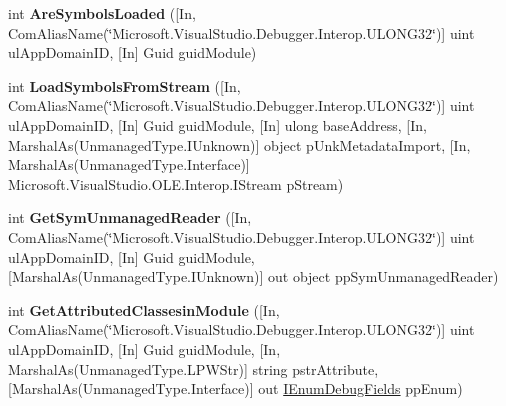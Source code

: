 \begin{DoxyCompactItemize}
\item 
\hypertarget{interface_microsoft_1_1_visual_studio_1_1_debugger_1_1_interop_e_e_1_1_i_debug_com_plus_symbol_provider2_a18fda72900c526d1e4e44181c9e6581f}{int {\bfseries Are\+Symbols\+Loaded} (\mbox{[}In, Com\+Alias\+Name(\char`\"{}Microsoft.\+Visual\+Studio.\+Debugger.\+Interop.\+U\+L\+O\+N\+G32\char`\"{})\mbox{]} uint ul\+App\+Domain\+I\+D, \mbox{[}In\mbox{]} Guid guid\+Module)}\label{interface_microsoft_1_1_visual_studio_1_1_debugger_1_1_interop_e_e_1_1_i_debug_com_plus_symbol_provider2_a18fda72900c526d1e4e44181c9e6581f}

\item 
\hypertarget{interface_microsoft_1_1_visual_studio_1_1_debugger_1_1_interop_e_e_1_1_i_debug_com_plus_symbol_provider2_a02071ed438612fba6e01a5adb0077161}{int {\bfseries Load\+Symbols\+From\+Stream} (\mbox{[}In, Com\+Alias\+Name(\char`\"{}Microsoft.\+Visual\+Studio.\+Debugger.\+Interop.\+U\+L\+O\+N\+G32\char`\"{})\mbox{]} uint ul\+App\+Domain\+I\+D, \mbox{[}In\mbox{]} Guid guid\+Module, \mbox{[}In\mbox{]} ulong base\+Address, \mbox{[}In, Marshal\+As(Unmanaged\+Type.\+I\+Unknown)\mbox{]} object p\+Unk\+Metadata\+Import, \mbox{[}In, Marshal\+As(Unmanaged\+Type.\+Interface)\mbox{]} Microsoft.\+Visual\+Studio.\+O\+L\+E.\+Interop.\+I\+Stream p\+Stream)}\label{interface_microsoft_1_1_visual_studio_1_1_debugger_1_1_interop_e_e_1_1_i_debug_com_plus_symbol_provider2_a02071ed438612fba6e01a5adb0077161}

\item 
\hypertarget{interface_microsoft_1_1_visual_studio_1_1_debugger_1_1_interop_e_e_1_1_i_debug_com_plus_symbol_provider2_a30ff383e2075aab86ed62d43daf86691}{int {\bfseries Get\+Sym\+Unmanaged\+Reader} (\mbox{[}In, Com\+Alias\+Name(\char`\"{}Microsoft.\+Visual\+Studio.\+Debugger.\+Interop.\+U\+L\+O\+N\+G32\char`\"{})\mbox{]} uint ul\+App\+Domain\+I\+D, \mbox{[}In\mbox{]} Guid guid\+Module, \mbox{[}Marshal\+As(Unmanaged\+Type.\+I\+Unknown)\mbox{]} out object pp\+Sym\+Unmanaged\+Reader)}\label{interface_microsoft_1_1_visual_studio_1_1_debugger_1_1_interop_e_e_1_1_i_debug_com_plus_symbol_provider2_a30ff383e2075aab86ed62d43daf86691}

\item 
\hypertarget{interface_microsoft_1_1_visual_studio_1_1_debugger_1_1_interop_e_e_1_1_i_debug_com_plus_symbol_provider2_af972f44f317e85d80d55064ea70978c6}{int {\bfseries Get\+Attributed\+Classesin\+Module} (\mbox{[}In, Com\+Alias\+Name(\char`\"{}Microsoft.\+Visual\+Studio.\+Debugger.\+Interop.\+U\+L\+O\+N\+G32\char`\"{})\mbox{]} uint ul\+App\+Domain\+I\+D, \mbox{[}In\mbox{]} Guid guid\+Module, \mbox{[}In, Marshal\+As(Unmanaged\+Type.\+L\+P\+W\+Str)\mbox{]} string pstr\+Attribute, \mbox{[}Marshal\+As(Unmanaged\+Type.\+Interface)\mbox{]} out \hyperlink{interface_microsoft_1_1_visual_studio_1_1_debugger_1_1_interop_e_e_1_1_i_enum_debug_fields}{I\+Enum\+Debug\+Fields} pp\+Enum)}\label{interface_microsoft_1_1_visual_studio_1_1_debugger_1_1_interop_e_e_1_1_i_debug_com_plus_symbol_provider2_af972f44f317e85d80d55064ea70978c6}


\end{DoxyCompactItemize}
